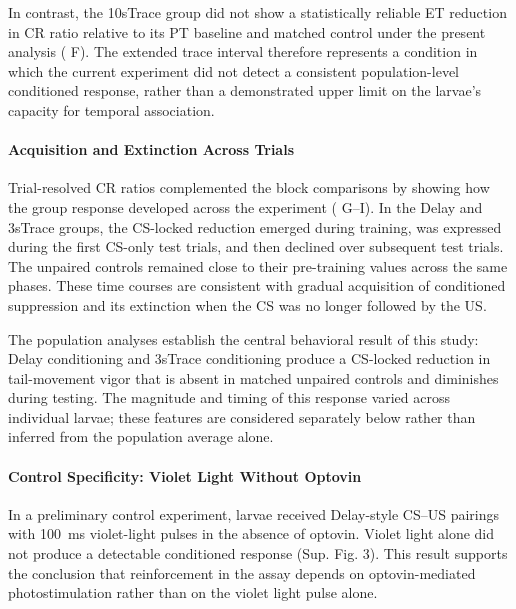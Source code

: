 In contrast, the 10sTrace group did not show a statistically reliable ET reduction in CR ratio relative to its PT baseline and matched control under the present analysis ( F). The extended trace interval therefore represents a condition in which the current experiment did not detect a consistent population-level conditioned response, rather than a demonstrated upper limit on the larvae's capacity for temporal association.

\paragraph{Acquisition and Extinction Across Trials}

Trial-resolved CR ratios complemented the block comparisons by showing how the group response developed across the experiment ( G--I). In the Delay and 3sTrace groups, the CS-locked reduction emerged during training, was expressed during the first CS-only test trials, and then declined over subsequent test trials. The unpaired controls remained close to their pre-training values across the same phases. These time courses are consistent with gradual acquisition of conditioned suppression and its extinction when the CS was no longer followed by the US.

The population analyses establish the central behavioral result of this study: Delay conditioning and 3sTrace conditioning produce a CS-locked reduction in tail-movement vigor that is absent in matched unpaired controls and diminishes during testing. The magnitude and timing of this response varied across individual larvae; these features are considered separately below rather than inferred from the population average alone.

\paragraph{Control Specificity: Violet Light Without Optovin}

In a preliminary control experiment, larvae received Delay-style CS--US pairings with \SI{100}{\milli\second} violet-light pulses in the absence of optovin. Violet light alone did not produce a detectable conditioned response (Sup. Fig. 3). This result supports the conclusion that reinforcement in the assay depends on optovin-mediated photostimulation rather than on the violet light pulse alone.

